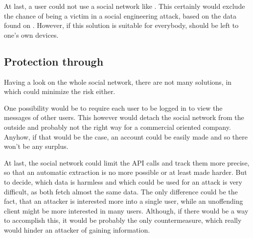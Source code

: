 At last, a user could not use a social network like \Twitter{}. This certainly
would exclude the chance of being a victim in a social engineering attack,
based on the data found on \Twitter{}. However, if this solution is suitable
for everybody, should be left to one's own devices.

\subsection{Protection through \Twitter{}}

Having a look on the whole social network, there are not many solutions, in
which \Twitter{} could minimize the risk either.

One possibility would be to require each user to be logged in to view the
messages of other users. This however would detach the \Twitter{} social
network from the outside and probably not the right way for a commercial
oriented company. Anyhow, if that would be the case, an account could be easily
made and so there won't be any surplus.

At last, the social network could limit the API calls and track them more
precise, so that an automatic extraction is no more possible or at least made
harder. But to decide, which data is harmless and which could be used for an
attack is very difficult, as both fetch almost the same data. The only
difference could be the fact, that an attacker is interested more into a single
user, while an unoffending \Twitter{} client might be more interested in many
users. Although, if there would be a way to accomplish this, it would be
probably the only countermeasure, which really would hinder an attacker of
gaining information.
